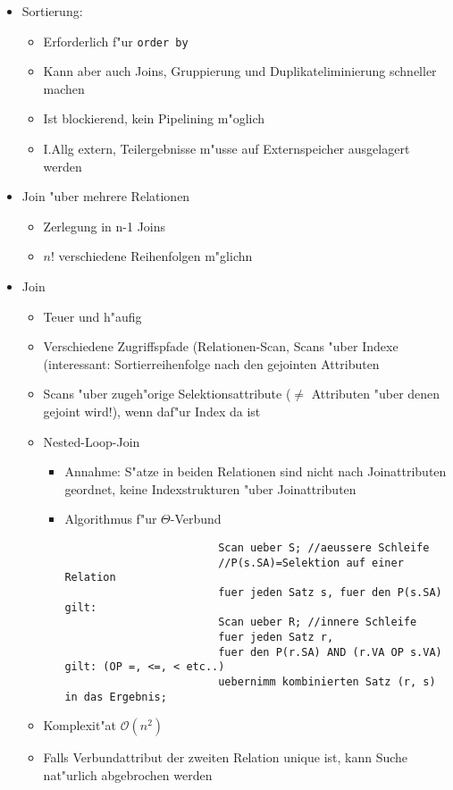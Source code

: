 \documentclass[a4paper, 12pt]{scrartcl}
\begin{document}
\begin{itemize}
	\item
		Sortierung:
		\begin{itemize}
			\item
				Erforderlich f"ur \lstinline$order by$
			\item
				Kann aber auch Joins, Gruppierung und Duplikateliminierung schneller machen
			\item
				Ist blockierend, kein Pipelining m"oglich
			\item
				I.Allg extern, Teilergebnisse m"usse auf Externspeicher ausgelagert werden
		\end{itemize}
	\item
		Join "uber mehrere Relationen
		\begin{itemize}
			\item
				Zerlegung in n-1 Joins
			\item
				$n!$ verschiedene Reihenfolgen m"glichn
		\end{itemize}

	\item
		Join
		\begin{itemize}
			\item
				Teuer und h"aufig
			\item
				Verschiedene Zugriffspfade (Relationen-Scan, Scans "uber Indexe (interessant: Sortierreihenfolge nach den gejointen Attributen
			\item
				Scans "uber zugeh"orige Selektionsattribute ($\neq$ Attributen "uber denen gejoint wird!), wenn daf"ur Index da ist
			\item
				Nested-Loop-Join
				\begin{itemize}
					\item
						Annahme: S"atze in beiden Relationen sind nicht nach Joinattributen geordnet, keine Indexstrukturen "uber Joinattributen
					\item
						Algorithmus f"ur $\Theta$-Verbund
						\begin{lstlisting}
						Scan ueber S; //aeussere Schleife
						//P(s.SA)=Selektion auf einer Relation
						fuer jeden Satz s, fuer den P(s.SA) gilt: 
						Scan ueber R; //innere Schleife
						fuer jeden Satz r,
						fuer den P(r.SA) AND (r.VA OP s.VA) gilt: (OP =, <=, < etc..)
						uebernimm kombinierten Satz (r, s) in das Ergebnis;
						\end{lstlisting}
				\end{itemize}
			\item
				Komplexit"at $\mathcal{O}(n^2)$
			\item
				Falls Verbundattribut der zweiten Relation unique ist, kann Suche nat"urlich abgebrochen werden
		\end{itemize}


\end{itemize}
\end{document}
